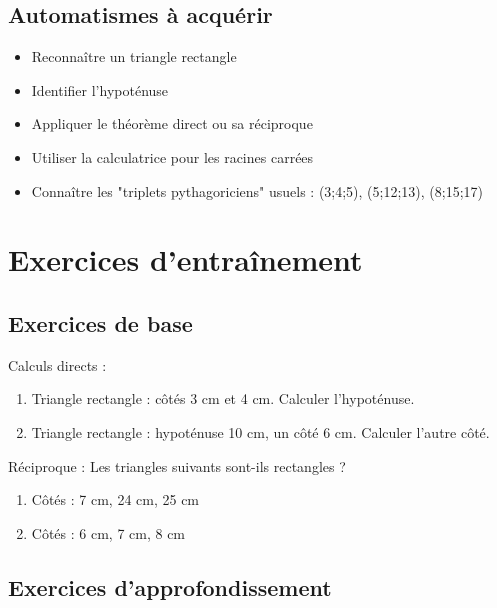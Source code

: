\subsection{Automatismes à acquérir}

\begin{itemize}
    \item Reconnaître un triangle rectangle
    \item Identifier l'hypoténuse
    \item Appliquer le théorème direct ou sa réciproque
    \item Utiliser la calculatrice pour les racines carrées
    \item Connaître les "triplets pythagoriciens" usuels : (3;4;5), (5;12;13), (8;15;17)
\end{itemize}

\section{Exercices d'entraînement}

\subsection{Exercices de base}

\begin{exercice}{3}
Calculs directs :
\begin{enumerate}[label=\alph*)]
    \item Triangle rectangle : côtés 3 cm et 4 cm. Calculer l'hypoténuse.
    \item Triangle rectangle : hypoténuse 10 cm, un côté 6 cm. Calculer l'autre côté.
\end{enumerate}
\end{exercice}

\begin{exercice}{4}
Réciproque : Les triangles suivants sont-ils rectangles ?
\begin{enumerate}[label=\alph*)]
    \item Côtés : 7 cm, 24 cm, 25 cm
    \item Côtés : 6 cm, 7 cm, 8 cm
\end{enumerate}
\end{exercice}

\subsection{Exercices d'approfondissement}

